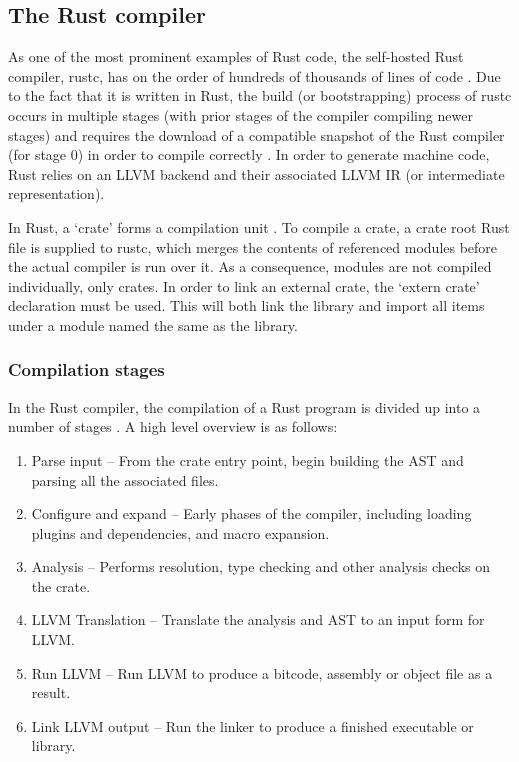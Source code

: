 
\subsection{The Rust compiler}
As one of the most prominent examples of Rust code, the self-hosted Rust compiler, rustc, has on the order of hundreds of thousands of lines of code \cite{openhub15}. Due to the fact that it is written in Rust, the build (or bootstrapping) process of rustc occurs in multiple stages (with prior stages of the compiler compiling newer stages) and requires the download of a compatible snapshot of the Rust compiler (for stage 0) in order to compile correctly \cite{makefile15}. In order to generate machine code, Rust relies on an LLVM backend and their associated LLVM IR (or intermediate representation).

In Rust, a `crate' forms a compilation unit \cite{examplecrates15}. To compile a crate, a crate root Rust file is supplied to rustc, which merges the contents of referenced modules before the actual compiler is run over it. As a consequence, modules are not compiled individually, only crates. In order to link an external crate, the `extern crate' declaration must be used. This will both link the library and import all items under a module named the same as the library. 

\subsubsection{Compilation stages}
In the Rust compiler, the compilation of a Rust program is divided up into a number of stages \cite{driver15}. A high level overview is as follows:

\begin{enumerate}
\item Parse input -- From the crate entry point, begin building the AST and parsing all the associated files.
\item Configure and expand -- Early phases of the compiler, including loading plugins and dependencies, and macro expansion.
\item Analysis -- Performs resolution, type checking and other analysis checks on the crate.
\item LLVM Translation -- Translate the analysis and AST to an input form for LLVM.
\item Run LLVM -- Run LLVM to produce a bitcode, assembly or object file as a result.
\item Link LLVM output -- Run the linker to produce a finished executable or library.
\end{enumerate}

